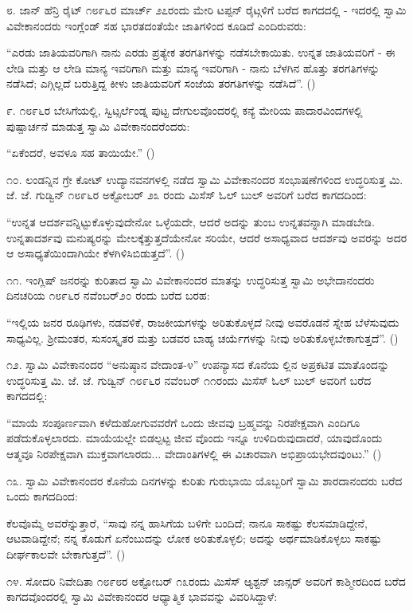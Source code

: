 ೮. ಜಾನ್ ಹೆನ್ರಿ ರೈಟ್ ೧೮೯೬ರ ಮಾರ್ಚ್ ೨೭ರಂದು ಮೇರಿ ಟಪ್ಪನ್ ರೈಟ್ಗಳಿಗೆ ಬರೆದ ಕಾಗದದಲ್ಲಿ - ಇದರಲ್ಲಿ ಸ್ವಾಮಿ ವಿವೇಕಾನಂದರು ಇಂಗ್ಲೆಂಡ್ ಸಹ ಭಾರತದಂತೆಯೇ ಜಾತಿಗಳಿಂದ ಕೂಡಿದೆ ಎಂದಿರುವರು:

“ಎರಡು ಜಾತಿಯವರಿಗಾಗಿ ನಾನು ಎರಡು ಪ್ರತ್ಯೇಕ ತರಗತಿಗಳನ್ನು ನಡೆಸಬೇಕಾಯಿತು. ಉನ್ನತ ಜಾತಿಯವರಿಗೆ - ಈ ಲೇಡಿ ಮತ್ತು ಆ ಲೇಡಿ ಮಾನ್ಯ ಇವರಿಗಾಗಿ ಮತ್ತು ಮಾನ್ಯ ಇವರಿಗಾಗಿ - ನಾನು ಬೆಳಗಿನ ಹೊತ್ತು ತರಗತಿಗಳನ್ನು ನಡೆಸಿದೆ; ಎಗ್ಗಿಲ್ಲದೆ ಬರುತ್ತಿದ್ದ ಕೀಳು ಜಾತಿಯವರಿಗೆ ಸಂಜೆಯ ತರಗತಿಗಳನ್ನು ನಡೆಸಿದೆ”. ()

೯. ೧೮೯೬ರ ಬೇಸಿಗೆಯಲ್ಲಿ, ಸ್ವಿಟ್ಸರ್ಲೆಂಡ್ನ ಪುಟ್ಟ ದೇಗುಲವೊಂದರಲ್ಲಿ ಕನ್ಯೆ ಮೇರಿಯ ಪಾದಾರವಿಂದಗಳಲ್ಲಿ ಪುಷ್ಪಾರ್ಚನೆ ಮಾಡುತ್ತ ಸ್ವಾಮಿ ವಿವೇಕಾನಂದರೆಂದರು:

“ಏಕೆಂದರೆ, ಅವಳೂ ಸಹ ತಾಯಿಯೇ.” ()

೧೦. ಲಂಡನ್ನಿನ ಗ್ರೇ ಕೋಟ್ ಉದ್ಯಾನವನಗಳಲ್ಲಿ ನಡೆದ ಸ್ವಾಮಿ ವಿವೇಕಾನಂದರ ಸಂಭಾಷಣೆಗಳಿಂದ ಉದ್ಧರಿಸುತ್ತ ಮಿ. ಜೆ. ಜೆ. ಗುಡ್ವಿನ್ ೧೮೯೬ರ ಅಕ್ಟೋಬರ್ ೨೩ ರಂದು ಮಿಸೆಸ್ ಓಲ್ ಬುಲ್ ಅವರಿಗೆ ಬರೆದ ಕಾಗದದಿಂದ:

“ಉನ್ನತ ಆದರ್ಶವನ್ನಿಟ್ಟುಕೊಳ್ಳುವುದೇನೋ ಒಳ್ಳೆಯದೇ, ಆದರೆ ಅದನ್ನು ತುಂಬ ಉನ್ನತವನ್ನಾಗಿ ಮಾಡಬೇಡಿ. ಉನ್ನತಾದರ್ಶವು ಮನುಷ್ಯರನ್ನು ಮೇಲಕ್ಕೆತ್ತುತ್ತದೆಯೇನೋ ಸರಿಯೇ, ಆದರೆ ಅಸಾಧ್ಯವಾದ ಆದರ್ಶವು ಅವರನ್ನು ಅದರ ಆ ಅಸಾಧ್ಯತೆಯಿಂದಾಗಿಯೇ ಕೆಳಗಿಳಿಸಿಬಿಡುತ್ತದೆ”. ()

೧೧. ಇಂಗ್ಲಿಷ್ ಜನರನ್ನು ಕುರಿತಾದ ಸ್ವಾಮಿ ವಿವೇಕಾನಂದರ ಮಾತನ್ನು ಉದ್ಧರಿಸುತ್ತ ಸ್ವಾಮಿ ಅಭೇದಾನಂದರು ದಿನಚರಿಯ ೧೮೯೬ರ ನವೆಂಬರ್೨೦ ರಂದು ಬರೆದ ಬರಹ:

“ಇಲ್ಲಿಯ ಜನರ ರೂಢಿಗಳು, ನಡವಳಿಕೆ, ರಾಜಕೀಯಗಳನ್ನು ಅರಿತುಕೊಳ್ಳದೆ ನೀವು ಅವರೊಡನೆ ಸ್ನೇಹ ಬೆಳೆಸುವುದು ಸಾಧ್ಯವಿಲ್ಲ. ಶ‍್ರೀಮಂತರ, ಸುಸಂಸ್ಕೃತರ ಮತ್ತು ಬಡವರ ಬಾಹ್ಯ ಚರ್ಯೆಗಳನ್ನು ನೀವು ಅರಿತುಕೊಳ್ಳಬೇಕಾಗುತ್ತದೆ”. ()

೧೨. ಸ್ವಾಮಿ ವಿವೇಕಾನಂದರ “ಅನುಷ್ಠಾನ ವೇದಾಂತ-೪” ಉಪನ್ಯಾಸದ ಕೊನೆಯ ಲ್ಲಿನ ಅಪ್ರಕಟಿತ ಮಾತೊಂದನ್ನು ಉದ್ಧರಿಸುತ್ತ ಮಿ. ಜೆ. ಜೆ. ಗುಡ್ವಿನ್ ೧೮೯೬ರ ನವೆಂಬರ್ ೧೧ರಂದು ಮಿಸೆಸ್ ಓಲ್ ಬುಲ್ ಅವರಿಗೆ ಬರೆದ ಕಾಗದದಲ್ಲಿ:

“ಮಾಯೆ ಸಂಪೂರ್ಣವಾಗಿ ಕಳೆದುಹೋಗುವವರೆಗೆ ಒಂದು ಜೀವವು ಬ್ರಹ್ಮವನ್ನು ನಿರಪೇಕ್ಷವಾಗಿ ಎಂದಿಗೂ ಪಡೆದುಕೊಳ್ಳಲಾರದು. ಮಾಯೆಯಲ್ಲೇ ಬಿಡಲ್ಪಟ್ಟ ಜೀವ ವೊಂದು ಇನ್ನೂ ಉಳಿದಿರುವುದಾದರೆ, ಯಾವುದೊಂದು ಆತ್ಮವೂ ನಿರಪೇಕ್ಷವಾಗಿ ಮುಕ್ತವಾಗಲಾರದು... ವೇದಾಂತಿಗಳಲ್ಲಿ ಈ ವಿಚಾರವಾಗಿ ಅಭಿಪ್ರಾಯಭೇದವುಂಟು.” ()

೧೩. ಸ್ವಾಮಿ ವಿವೇಕಾನಂದರ ಕೊನೆಯ ದಿನಗಳನ್ನು ಕುರಿತು ಗುರುಭಾಯಿ ಯೊಬ್ಬರಿಗೆ ಸ್ವಾಮಿ ಶಾರದಾನಂದರು ಬರೆದ ಒಂದು ಕಾಗದದಿಂದ:

ಕೆಲವೊಮ್ಮೆ ಅವರೆನ್ನುತ್ತಾರೆ, “ಸಾವು ನನ್ನ ಹಾಸಿಗೆಯ ಬಳಿಗೇ ಬಂದಿದೆ; ನಾನೂ ಸಾಕಷ್ಟು ಕೆಲಸಮಾಡಿದ್ದೇನೆ, ಆಟವಾಡಿದ್ದೇನೆ; ನನ್ನ ಕೊಡುಗೆ ಏನೆಂಬುದನ್ನು ಲೋಕ ಅರಿತುಕೊಳ್ಳಲಿ; ಅದನ್ನು ಅರ್ಥಮಾಡಿಕೊಳ್ಳಲು ಸಾಕಷ್ಟು ದೀರ್ಘಕಾಲವೇ ಬೇಕಾಗುತ್ತದೆ”. ()

೧೪. ಸೋದರಿ ನಿವೇದಿತಾ ೧೮೯೮ರ ಅಕ್ಟೋಬರ್ ೧೩ರಂದು ಮಿಸೆಸ್ ಆ್ಯಶ್ಟನ್ ಜಾನ್ಸರ್ ಅವರಿಗೆ ಕಾಶ್ಮೀರದಿಂದ ಬರೆದ ಕಾಗದವೊಂದರಲ್ಲಿ ಸ್ವಾಮಿ ವಿವೇಕಾನಂದರ ಆಧ್ಯಾತ್ಮಿಕ ಭಾವವನ್ನು ವಿವರಿಸಿದ್ದಾಳೆ:

